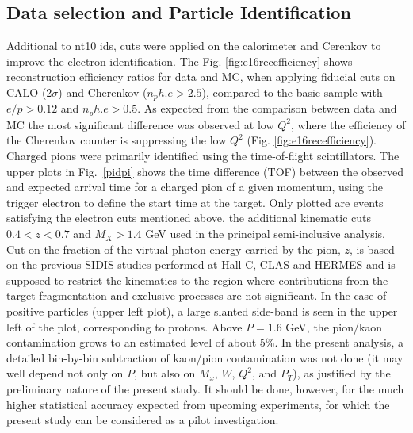 \documentclass[11pt,a4paper]{article}
\begin{document}
\subsection{Data selection and Particle Identification}
Additional to nt10 ids, cuts were applied on the calorimeter and Cerenkov to improve the
electron identification. 
The Fig. \ref{fig:e16recefficiency} shows reconstruction efficiency ratios for
data and MC, when applying fiducial cuts on CALO (2$\sigma$) and Cherenkov ($n_ph.e>2.5$),
compared to the basic sample with $e/p>0.12$ and $n_ph.e>0.5$.
As expected from the comparison between data and MC  the
most significant difference was observed at low $Q^2$, where the efficiency of the
Cherenkov counter is suppressing the low $Q^2$ (Fig. \ref{fig:e16recefficiency}).
Charged pions were primarily identified using the time-of-flight
scintillators. The upper plots in 
Fig.~\ref{pidpi} shows the time difference (TOF)
between the observed and expected arrival time for a charged pion of 
a given momentum, using the trigger electron to define the
start time at the target. Only plotted are events satisfying the electron
cuts mentioned above, the additional kinematic cuts
$0.4<z<0.7$ and  $M_X>1.4$ GeV used in the principal semi-inclusive
analysis. Cut on the fraction of the virtual photon energy
carried by the pion, $z$, is based on the previous SIDIS studies performed at Hall-C, CLAS and HERMES and is supposed
to restrict the kinematics to the region where contributions from the target fragmentation and exclusive processes 
are not significant.  
In the case of positive particles (upper left plot),
a large slanted side-band is seen in the upper left of the plot,
corresponding to protons.  Above $P=1.6$ GeV, the pion/kaon contamination
grows to an estimated level of  about 5\%. In the present analysis,
a detailed bin-by-bin subtraction of kaon/pion contamination was not
done (it may well depend not only on $P$, but also on $M_x$, $W$,
$Q^2$, and $P_T$), as justified by the preliminary nature of the present
study. It should be done, however, for the much higher statistical
accuracy expected from upcoming experiments, for which the present
study can be considered as a pilot investigation.
\end{document}
